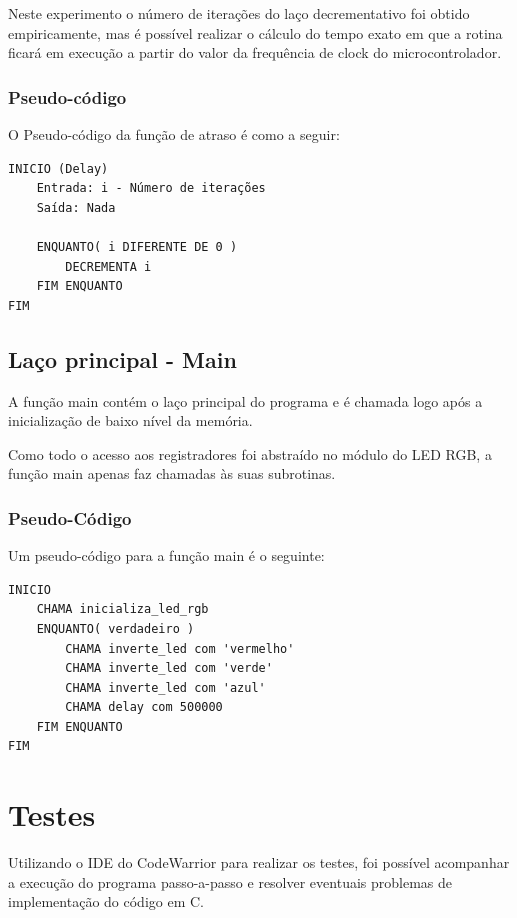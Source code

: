 \documentclass{article}
\begin{document}
Neste experimento o número de iterações do laço decrementativo foi obtido empiricamente, mas é possível realizar o cálculo do tempo exato em que a rotina ficará em execução a partir do valor da frequência de clock do microcontrolador.

\subsubsection{Pseudo-código}

O Pseudo-código da função de atraso é como a seguir:

\begin{verbatim}
INICIO (Delay)
    Entrada: i - Número de iterações
    Saída: Nada

    ENQUANTO( i DIFERENTE DE 0 )
        DECREMENTA i
    FIM ENQUANTO
FIM
\end{verbatim}

\subsection{Laço principal - Main}

A função main contém o laço principal do programa e é chamada logo após a inicialização de baixo nível da memória.

Como todo o acesso aos registradores foi abstraído no módulo do LED RGB, a função main apenas faz chamadas às suas subrotinas.

\subsubsection{Pseudo-Código}
Um pseudo-código para a função main é o seguinte:

\begin{verbatim}
INICIO
    CHAMA inicializa_led_rgb
    ENQUANTO( verdadeiro )
        CHAMA inverte_led com 'vermelho'
        CHAMA inverte_led com 'verde'
        CHAMA inverte_led com 'azul'
        CHAMA delay com 500000
    FIM ENQUANTO
FIM
\end{verbatim}

\clearpage
\section{Testes}

Utilizando o IDE do CodeWarrior para realizar os testes, foi possível acompanhar a execução do programa passo-a-passo e resolver eventuais problemas de implementação do código em C.
\end{document}
